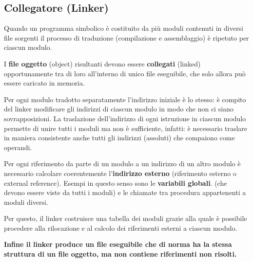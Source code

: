 \documentclass[12pt]{article}
\begin{document}
\subsection{Collegatore (Linker)}
Quando un programma simbolico è costituito da più moduli contenuti in diversi file sorgenti il processo di traduzione (compilazione e assemblaggio) è ripetuto per ciascun modulo.\par\medskip\noindent 
I \textbf{file oggetto} (object) risultanti devono essere \textbf{collegati} (linked) opportunamente tra di loro all’interno di unico file eseguibile, che solo allora può essere caricato in memoria.\par\medskip\noindent
Per ogni modulo tradotto separatamente l’indirizzo iniziale è lo stesso: è compito del linker modificare gli indirizzi di ciascun modulo in modo che non ci siano sovrapposizioni.
La traslazione dell’indirizzo di ogni istruzione in ciascun modulo permette di unire tutti i moduli ma non è sufficiente, infatti: è necessario traslare in maniera consistente anche tutti gli indirizzi (assoluti) che compaiono come operandi.\par\medskip\noindent
Per ogni riferimento da parte di un modulo a un indirizzo di un altro modulo è necessario calcolare coerentemente l’\textbf{indirizzo esterno} (riferimento esterno o external reference). Esempi in questo senso sono le \textbf{variabili globali}. (che devono essere viste da tutti i moduli) e le chiamate tra procedura appartenenti a moduli diversi.\par\medskip\noindent
Per questo, il linker costruisce una tabella dei moduli grazie alla quale è possibile procedere alla rilocazione e al calcolo dei riferimenti esterni a ciascun modulo.\par\medskip\noindent 
\textbf{ Infine il linker produce un file eseguibile che di norma ha la stessa struttura di un file oggetto, ma non contiene riferimenti non risolti.}\par\medskip\noindent 
\end{document}
